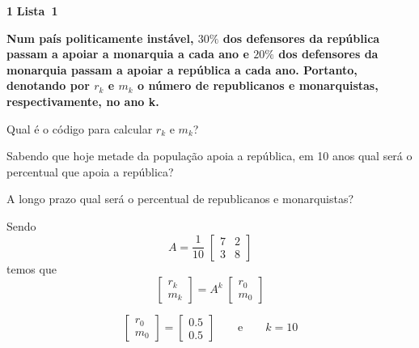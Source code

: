 \documentclass{article}
\newenvironment{question}
    {\medskip\bfseries\large}
    {\medskip}
\newcounter{exe-list}
\newenvironment{exe-list}
    {\begin{list}{(\alph{exe-list})}{\usecounter{exe-list}}}
    {\end{list}}
\newenvironment{exe}[2][Sala]
    {\bigskip\noindent\par\ifthenelse{\equal{#1}{}}%
        {\textbf{\LARGE #2}}%
        {\textbf{\LARGE #1~#2}}%
    \medskip\noindent\par}
    {\bigskip}
\begin{document}
\begin{exe}[Lista]{1}
    \begin{question}
        Num país politicamente instável,
        \(30\%\) dos defensores da república
        passam a apoiar a monarquia a cada ano e
        \(20\%\) dos defensores da monarquia
        passam a apoiar a república a cada ano.
        Portanto, denotando por \(r_k\) e \(m_k\)
        o número de republicanos e monarquistas,
        respectivamente, no ano k.
        \begin{exe-list}
            \item
                Qual é o código para calcular
                \(r_k\) e \(m_k\)?
            \item
                Sabendo que hoje metade da população
                apoia a república,
                em 10 anos
                qual será o percentual que apoia a república?
            \item
                A longo prazo qual será
                o percentual de republicanos e monarquistas?
        \end{exe-list}
    \end{question}

    \begin{exe-list}
        \item
            Sendo
            \[
                A = \frac{1}{10} \; \begin{bmatrix}
                    7 & 2 \\
                    3 & 8
                \end{bmatrix}
            \]
            temos que
            \[
                \begin{bmatrix}
                    r_k \\ m_k
                \end{bmatrix}
                = A^k \;
                \begin{bmatrix}
                    r_0 \\ m_0
                \end{bmatrix}
            \]
        \item
            \[
                \begin{bmatrix}
                    r_0 \\ m_0
                \end{bmatrix}
                = \begin{bmatrix}
                    0.5 \\ 0.5
                \end{bmatrix}
                \qquad\text{e}\qquad
                k = 10
            \]


\end{exe-list}
\end{exe}
\end{document}
